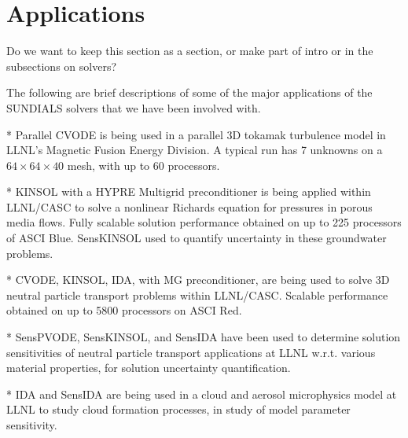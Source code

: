 \section{Applications}

{\sf Do we want to keep this section as a section, or make part of intro or in the subsections on solvers?}

The following are brief descriptions of some of the major applications
of the SUNDIALS solvers that we have been involved with.

* Parallel CVODE is being used in a parallel 3D tokamak turbulence model in
LLNL's Magnetic Fusion Energy Division.  A typical run has 7 unknowns
on a $64 \times 64 \times 40$ mesh, with up to 60 processors.

* KINSOL with a HYPRE Multigrid preconditioner is being applied within
LLNL/CASC to solve a nonlinear Richards equation for pressures in
porous media flows.  Fully scalable solution performance obtained on
up to 225 processors of ASCI Blue.  SensKINSOL used to quantify
uncertainty in these groundwater problems.

* CVODE, KINSOL, IDA, with MG preconditioner, are being used to
solve 3D neutral particle transport problems within LLNL/CASC.
Scalable performance obtained on up to 5800 processors on ASCI Red.

* SensPVODE, SensKINSOL, and SensIDA have been used to determine
solution sensitivities of neutral particle transport applications at
LLNL w.r.t. various material properties, for solution uncertainty
quantification.

* IDA and SensIDA are being used in a cloud and aerosol microphysics
model at LLNL to study cloud formation processes, in study of model
parameter sensitivity.


